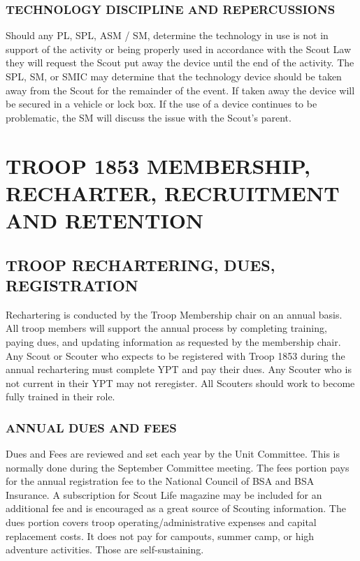 \documentclass{ltxguide}
\begin{document}
\subsubsection{TECHNOLOGY DISCIPLINE AND REPERCUSSIONS}
Should any \ac{PL}, \ac{SPL}, \ac{ASM} / \ac{SM}, determine the technology in use is not in support of the activity or being properly used in accordance with the Scout Law they will request the Scout put away the device until the end of the activity. The \ac{SPL}, \ac{SM}, or \ac{SMIC} may determine that the technology device should be taken away from the Scout for the remainder of the event. If taken away the device will be secured in a vehicle or lock box. If the use of a device continues to be problematic, the \ac{SM} will discuss the issue with the Scout's parent.

\section{TROOP 1853 MEMBERSHIP, RECHARTER, RECRUITMENT AND RETENTION}
\subsection{TROOP RECHARTERING, DUES, REGISTRATION}
Rechartering is conducted by the Troop Membership chair on an annual basis. All troop members will support the annual process by completing training, paying dues, and updating information as requested by the membership chair. Any Scout or Scouter who expects to be registered with Troop 1853 during the annual rechartering must complete \ac{YPT} and pay their dues. Any Scouter who is not current in their \ac{YPT} may not reregister. All Scouters should work to become fully trained in their role. 

\subsubsection{ANNUAL DUES AND FEES}
Dues and Fees are reviewed and set each year by the Unit Committee. This is normally done during the September Committee meeting. The fees portion pays for the annual registration fee to the National Council of \ac{BSA} and \ac{BSA} Insurance. A subscription for Scout Life magazine may be included for an additional fee and is encouraged as a great source of Scouting information. The dues portion covers troop operating/administrative expenses and capital replacement costs. It does not pay for campouts, summer camp, or high adventure activities. Those are self-sustaining. 
\end{document}
